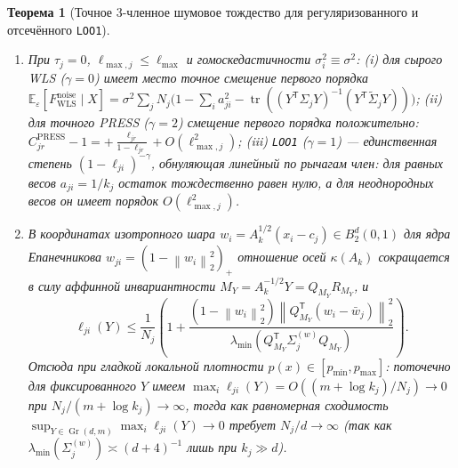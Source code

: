 \documentclass[11pt,a4paper]{article}
\numberwithin{equation}{section}
\newtheorem{theorem}{Теорема}[section]
\theoremstyle{definition}
\theoremstyle{remark}
\newcommand{\E}{\mathbb{E}}
\newcommand{\tr}{\operatorname{tr}}
\newcommand{\Gr}{\operatorname{Gr}}
\newcommand{\T}{^{\mathsf T}}
\newcommand{\norm}[1]{\left\lVert #1 \right\rVert}
\begin{document}
\begin{theorem}[Точное 3-членное шумовое тождество для регуляризованного и отсечённого \texttt{LOO1}]
\begin{enumerate}[label=(\alph*)]
\begin{equation}
\begin{aligned}
  \end{aligned}
  \end{equation}
  \item При $\tau_j = 0$, $\ell_{\max,j} \le \ell_{\max}$ и гомоскедастичности $\sigma_i^2 \equiv \sigma^2$:
  (i) для сырого WLS ($\gamma=0$) имеет место точное смещение первого порядка
  $\E_\varepsilon[F_{\mathrm{WLS}}^{\mathrm{noise}} \mid X] = \sigma^2 \sum_j N_j \bigl(1 - \sum_i a_{ji}^2 - \tr((Y\T \Sigma_j Y)^{-1}(Y\T \widetilde{\Sigma}_j Y))\bigr)$;
  (ii) для точного PRESS ($\gamma=2$) смещение первого порядка положительно: $C_{jr}^{\mathrm{PRESS}} - 1 = +\frac{\ell_{jr}}{1-\ell_{jr}} + O(\ell_{\max,j}^2)$;
  (iii) \texttt{LOO1} ($\gamma=1$) — единственная степень $(1-\ell_{ji})^{-\gamma}$, обнуляющая линейный по рычагам член:
  для равных весов $a_{ji} = 1/k_j$ остаток тождественно равен нулю, а для неоднородных весов он имеет порядок $O(\ell_{\max,j}^2)$.
  \item В координатах изотропного шара $w_i = A_k^{1/2}(x_i - c_j) \in B_2^d(0,1)$ для ядра Епанечникова
  $w_{ji} = (1 - \norm{w_i}_2^2)_+$ отношение осей $\kappa(A_k)$ сокращается в силу аффинной инвариантности
  $M_Y = A_k^{-1/2} Y = Q_{M_Y} R_{M_Y}$, и
  \[
    \ell_{ji}(Y) \le \frac{1}{N_j}\left(1 + \frac{(1 - \norm{w_i}_2^2)\norm{Q_{M_Y}\T(w_i - \bar{w}_j)}_2^2}{\lambda_{\min}(Q_{M_Y}\T \Sigma_j^{(w)} Q_{M_Y})}\right).
  \]
  Отсюда при гладкой локальной плотности $p(x) \in [p_{\min}, p_{\max}]$:
  поточечно для фиксированного $Y$ имеем $\max_i \ell_{ji}(Y) = O((m + \log k_j)/N_j) \to 0$ при $N_j/(m+\log k_j) \to \infty$,
  тогда как равномерная сходимость $\sup_{Y \in \Gr(d,m)} \max_i \ell_{ji}(Y) \to 0$ требует $N_j / d \to \infty$
  (так как $\lambda_{\min}(\Sigma_j^{(w)}) \asymp (d+4)^{-1}$ лишь при $k_j \gg d$).
\end{enumerate}
\end{theorem}
\end{document}
